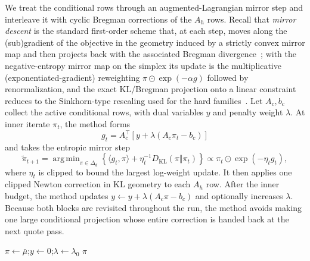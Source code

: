 \documentclass{article}
\newcommand{\argmin}{\operatorname{arg\,min}}
\begin{document}
We treat the conditional rows through an augmented-Lagrangian mirror step and interleave it with cyclic Bregman corrections of the $A_h$ rows.
Recall that \emph{mirror descent} is the standard first-order scheme that, at each step, moves along the (sub)gradient of the objective in the geometry induced by a strictly convex mirror map and then projects back with the associated Bregman divergence~\citep{nemirovski1983problem,beck2003mirror}; with the negative-entropy mirror map on the simplex its update is the multiplicative (exponentiated-gradient) reweighting $\pi\odot\exp(-\alpha g)$ followed by renormalization, and the exact KL/Bregman projection onto a linear constraint reduces to the Sinkhorn-type rescaling used for the hard families~\citep{Benamou2015Iterative}.
Let $A_c,b_c$ collect the active conditional rows, with dual variables $y$ and penalty weight $\lambda$.
At inner iterate $\pi_t$, the method forms
\begin{equation}\label{eq:aug_gradient}
g_t=A_c^\top\!\left[y+\lambda(A_c\pi_t-b_c)\right]
\end{equation}
and takes the entropic mirror step
\begin{equation}\label{eq:mirror_step}
\widetilde\pi_{t+1}
=\argmin_{\pi\in\Delta_d}
\left\{\langle g_t,\pi\rangle+\eta_t^{-1}D_{\mathrm{KL}}(\pi\Vert\pi_t)\right\}
\propto \pi_t\odot\exp(-\eta_t g_t),
\end{equation}
where $\eta_t$ is clipped to bound the largest log-weight update.
It then applies one clipped Newton correction in KL geometry to each $A_h$ row.
After the inner budget, the method updates
$y\leftarrow y+\lambda(A_c\pi-b_c)$ and optionally increases $\lambda$.
Because both blocks are revisited throughout the run, the method avoids making one large conditional projection whose entire correction is handed back at the next quote pass.

\begin{algorithm}[H]
\caption{Augmented-Bregman solver for SPX--VIX calibration}
\label{alg:augmented}
\DontPrintSemicolon
{}
\BlankLine
$\pi \leftarrow \bar\mu$;\quad $y \leftarrow 0$;\quad $\lambda \leftarrow \lambda_0$\;
\Return $\pi$\;
\end{algorithm}
\end{document}
